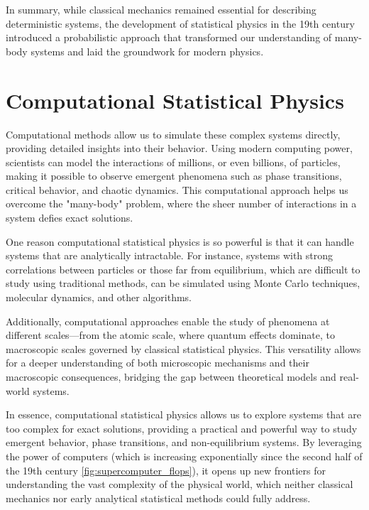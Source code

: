 \documentclass[ansiapaper]{report}
\begin{document}
\begin{multicols}{3}
	In summary, while classical mechanics remained essential for describing deterministic systems, the development of statistical physics in the 19th century introduced a probabilistic approach that transformed our understanding of many-body systems and laid the groundwork for modern physics.

	\section{Computational Statistical Physics}

	Computational methods allow us to simulate these complex systems directly, providing detailed insights into their behavior. Using modern computing power, scientists can model the interactions of millions, or even billions, of particles, making it possible to observe emergent phenomena such as phase transitions, critical behavior, and chaotic dynamics. This computational approach helps us overcome the "many-body" problem, where the sheer number of interactions in a system defies exact solutions.

	One reason computational statistical physics is so powerful is that it can handle systems that are analytically intractable. For instance, systems with strong correlations between particles or those far from equilibrium, which are difficult to study using traditional methods, can be simulated using Monte Carlo techniques, molecular dynamics, and other algorithms.

	Additionally, computational approaches enable the study of phenomena at different scales—from the atomic scale, where quantum effects dominate, to macroscopic scales governed by classical statistical physics. This versatility allows for a deeper understanding of both microscopic mechanisms and their macroscopic consequences, bridging the gap between theoretical models and real-world systems.

	In essence, computational statistical physics allows us to explore systems that are too complex for exact solutions, providing a practical and powerful way to study emergent behavior, phase transitions, and non-equilibrium systems. By leveraging the power of computers (which is increasing exponentially since the second half of the 19th century \cref{fig:supercomputer_flops}), it opens up new frontiers for understanding the vast complexity of the physical world, which neither classical mechanics nor early analytical statistical methods could fully address.


\end{multicols}
\end{document}

